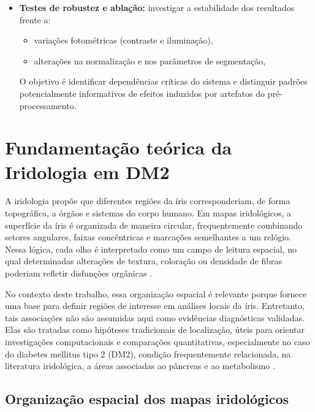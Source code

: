 \documentclass[12pt,a4paper]{article}
\begin{document}
\begin{itemize}
    \item \textbf{Testes de robustez e ablação:} investigar a estabilidade dos resultados frente a:
    \begin{itemize}
        \item variações fotométricas (contraste e iluminação),
        \item alterações na normalização e nos parâmetros de segmentação,
    \end{itemize}
    O objetivo é identificar dependências críticas do sistema e distinguir padrões potencialmente informativos de efeitos induzidos por artefatos do pré-processamento.
\end{itemize}

\section{Fundamentação teórica da Iridologia em DM2}

A iridologia propõe que diferentes regiões da íris corresponderiam, de forma topográfica, a órgãos e sistemas do corpo humano. Em mapas iridológicos, a superfície da íris é organizada de maneira circular, frequentemente combinando setores angulares, faixas concêntricas e marcações semelhantes a um relógio. Nessa lógica, cada olho é interpretado como um campo de leitura espacial, no qual determinadas alterações de textura, coloração ou densidade de fibras poderiam refletir disfunções orgânicas \citep{Jensen1982, Deck1981}.

No contexto deste trabalho, essa organização espacial é relevante porque fornece uma base para definir regiões de interesse em análises locais da íris. Entretanto, tais associações não são assumidas aqui como evidências diagnósticas validadas. Elas são tratadas como hipóteses tradicionais de localização, úteis para orientar investigações computacionais e comparações quantitativas, especialmente no caso do diabetes mellitus tipo 2 (DM2), condição frequentemente relacionada, na literatura iridológica, a áreas associadas ao pâncreas e ao metabolismo \citep{Ernst2000ArchOphthalmol, Simon1979JAMA, Knipschild1988BMJ}.

\subsection{Organização espacial dos mapas iridológicos}
\end{document}
